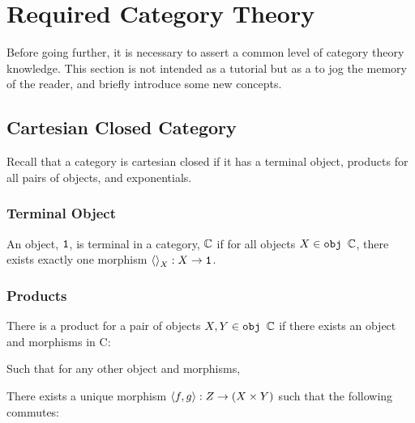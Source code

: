 \documentclass{Report}
\begin{document}
\chapter{Required Category Theory}\label{CategoryTheoryRequirements}

Before going further, it is necessary to assert a common level of category theory knowledge. This section is not intended as a tutorial but as a to jog the memory of the reader, and briefly introduce some new concepts.

\section{Cartesian Closed Category}\label{CCC}

Recall that a category is cartesian closed if it has a terminal object, products for all pairs of objects, and exponentials.

\subsection{Terminal Object}
An object, $\texttt{1}$, is terminal in a category, $\mathbb{C}$ if for all objects $X\in\texttt{obj }\mathbb{C}$, there exists exactly one morphism $\left\langle\right\rangle_{X}: X \rightarrow \texttt{1}$.

\subsection{Products}
There is a product for a pair of objects $X, Y\in\texttt{obj }\mathbb{C}$ if there exists an object and morphisms in C:

Such that for any other object and morphisms,


There exists a unique morphism $\left\langle f, g\right\rangle: Z \rightarrow (X\times Y)$ such that the following commutes:

\end{document}
